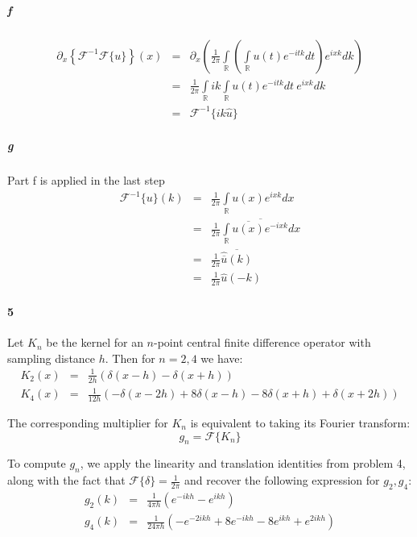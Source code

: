 \documentclass{article}
\begin{document}
\subparagraph{f}
\begin{eqnarray*}
\partial_x \left \{ \mathcal{F}^{-1} \mathcal{F}\{ u \}  \right \}(x) & = & \partial_x \left ( \frac{1}{2 \pi}\int \limits_\mathbb{R} \left( \int \limits_\mathbb{R} u(t) e^{-i t k} dt \right) e^{i x k} dk \right) \\
& = & \frac{1}{2 \pi} \int \limits_\mathbb{R} i k  \int \limits_\mathbb{R} u(t) e^{-i t k} dt \: e^{i x k} dk \\
& = & \mathcal{F}^{-1} \{ i k \hat{u} \}
\end{eqnarray*}

\subparagraph{g}
Part f is applied in the last step
\begin{eqnarray*}
\mathcal{F}^{-1} \{ u \} (k) & = & \frac{1}{2 \pi} \int \limits_\mathbb{R} u(x) e^{i x k} dx \\
& = & \frac{1}{2 \pi} \overline{ \int \limits_\mathbb{R} \overline{u(x)} e^{-i x k} d x } \\
& = & \frac{1}{2 \pi} \overline{ \hat{ \overline{u} } (k) } \\
& = & \frac{1}{2 \pi} \hat{u}(-k)
\end{eqnarray*}


\paragraph{5}
Let $K_n$ be the kernel for an $n$-point central finite difference operator with sampling distance $h$.  Then for $n=2,4$ we have:
\begin{eqnarray*}
K_2(x) & = & \frac{1}{2h} \left( \delta(x-h) - \delta(x+h) \right) \\
K_4(x) & = & \frac{1}{12h} \left( -\delta(x-2h) + 8 \delta(x-h) - 8 \delta(x+h) + \delta(x+2h) \right)
\end{eqnarray*}

The corresponding multiplier for $K_n$ is equivalent to taking its Fourier transform:
\[ g_n = \mathcal{F}\{ K_n \} \]

To compute $g_n$, we apply the linearity and translation identities from problem 4, along with the fact that $\mathcal{F}\{\delta\} = \frac{1}{2 \pi}$ and recover the following expression for $g_2, g_4$:
\begin{eqnarray*}
g_2(k) & = & \frac{1}{4 \pi h} \left( e^{-ikh} - e^{ikh} \right) \\
g_4(k) & = & \frac{1}{24 \pi h} \left( -e^{-2ikh} + 8 e^{-ikh} - 8 e^{ikh} + e^{2ikh} \right)
\end{eqnarray*}
\end{document}
